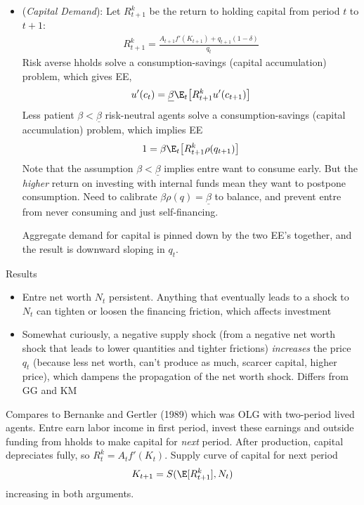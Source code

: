 \documentclass[12pt]{article}
\theoremstyle{plain}
\theoremstyle{definition}
\theoremstyle{remark}
\begin{document}
\begin{itemize}
  \item
    (\emph{Capital Demand}):
    Let $R_{t+1}^k$ be the return to holding capital from period $t$ to
    $t+1$:
    \begin{align*}
      R_{t+1}^k =
      \frac{A_{t+1}f'(K_{t+1})+q_{t+1}(1-\delta)}{q_t}
    \end{align*}
    Risk averse hholds solve a consumption-savings (capital accumulation)
    problem, which gives EE,
    \begin{align*}
      u'(c_t)
      =
      \underline{\beta}
      \E_t
      \big[
        R_{t+1}^k
        u'(c_{t+1})
      \big]
    \end{align*}
    Less patient $\beta<\underline{\beta}$ risk-neutral agents solve a
    consumption-savings (capital accumulation) problem, which implies EE
    \begin{align*}
      1
      =
      {\beta}
      \E_t
      \big[
        R_{t+1}^k
        \rho(q_{t+1})
      \big]
    \end{align*}
    Note that the assumption $\beta<\underline{\beta}$ implies entre want to
    consume early.
    But the \emph{higher} return on investing with internal funds mean they
    want to postpone consumption.
    Need to calibrate $\beta\rho(q)=\underline{\beta}$ to balance, and
    prevent entre from never consuming and just self-financing.

    Aggregate demand for capital is pinned down by the two EE's together,
    and the result is downward sloping in $q_{t}$.


\end{itemize}


Results
\begin{itemize}
  \item Entre net worth $N_t$ persistent. Anything that eventually leads
    to a shock to $N_t$ can tighten or loosen the financing friction,
    which affects investment
  \item Somewhat curiously, a negative supply shock (from a negative net
    worth shock that leads to lower quantities and tighter frictions)
    \emph{increases} the price $q_t$ (because less net worth, can't
    produce as much, scarcer capital, higher price), which dampens the
    propagation of the net worth shock.
    Differs from GG and KM
\end{itemize}

Compares to Bernanke and Gertler (1989) which was OLG with two-period
lived agents.
Entre earn labor income in first period, invest these earnings and
outside funding from hholds to make capital for \emph{next} period.
After production, capital depreciates fully, so
$R_t^k = A_tf'(K_t)$.
Supply curve of capital for next period
\begin{align*}
  K_{t+1}
  =S(\E[R_{t+1}^k],N_t)
\end{align*}
increasing in both arguments.
\end{document}
